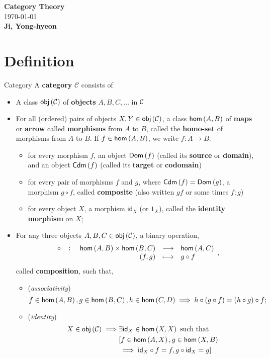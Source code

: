 \documentclass[11pt,openany]{article}
\begin{document}
\begin{center}
	\huge\textbf{Category Theory}\\
	\vspace{0.5em}
	\normalsize{\today}\\
	\vspace{0.5em}
	\large\textbf{Ji, Yong-hyeon}\\
	\vspace{0.5em}
\end{center}

\section{Definition}
\begin{defbox}{Category}
	A \textbf{category} $\mathcal{C}$ consists of 
	\begin{itemize}
		\item A class $\mathsf{obj}\left(\mathcal{C}\right)$ of \textbf{objects} $A,B,C,\dots$ in $\mathcal{C}$
		\item For all (ordered) pairs of objects $X,Y\in\mathsf{obj}\left(\mathcal{C}\right)$, a class $\mathsf{hom}\left(A,B\right)$ of \textbf{maps} or \textbf{arrow} called \textbf{morphisms} from $A$ to $B$, called the \textbf{homo-set} of morphisms from $A$ to $B$. If $f\in\mathsf{hom}\left(A,B\right)$, we write $f:A\to B$.
		\begin{itemize}
			\item for every morphism $f$, an object $\mathsf{Dom}\left(f\right)$ (called its \textbf{source} or \textbf{domain}), and an object $\mathsf{Cdm}\left(f\right)$ (called its \textbf{target} or \textbf{codomain})
			\item for every pair of morphisms $f$ and $g$, where $\mathsf{Cdm}\left(f\right)=\mathsf{Dom}\left(g\right)$, a morphism $g\circ f$, called \textbf{composite} (also written $gf$ or some times $f;g$)
			\item for every object $X$, a morphism $\mathsf{id}_X$ (or $1_X$), called the \textbf{identity morphism} on $X$;
		\end{itemize}
		\item For any three objects $A,B,C\in\mathsf{obj}\left(\mathcal{C}\right)$, a binary operation, \[
		\fullfunction{\circ}{\homo{A,B}\times\homo{B,C}}{\homo{A,C}}{(f,g)}{g\circ f},
		\] called \textbf{composition}, such that,
		\begin{itemize}
			\item (\textit{associativity}) \[
			f\in\mathsf{hom}\left(A,B\right),g\in\mathsf{hom}\left(B,C\right),h\in\mathsf{hom}\left(C,D\right)\implies h\circ(g\circ f)=(h\circ g)\circ f;
			\]
			\item (\textit{identity}) \begin{align*}
				X\in\obj{\mathcal{C}}\implies&\exists\mathsf{id}_X\in\homo{X,X}\ \text{such that}\\
				&[f\in\homo{A,X},g\in\homo{X,B}\\
				&\implies \id_X\circ f=f, g\circ\mathsf{id}_X=g]
			\end{align*}
		\end{itemize}
	\end{itemize}
\end{defbox}
\end{document}

